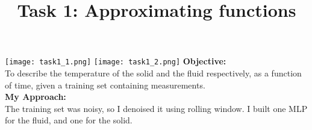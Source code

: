 \documentclass{article}
\title{Task 1: Approximating functions}
\begin{document}
\maketitle
\texttt{[image: task1\_1.png]}
\texttt{[image: task1\_2.png]}
\vspace{5mm}
\textbf{Objective:}\\
To describe the temperature of the solid and the fluid respectively, as a function of time, given a training set containing measurements.\\
\textbf{My Approach:}\\
The training set was noisy, so I denoised it using rolling window. I built one MLP for the fluid, and one for the solid. 
\end{document}
